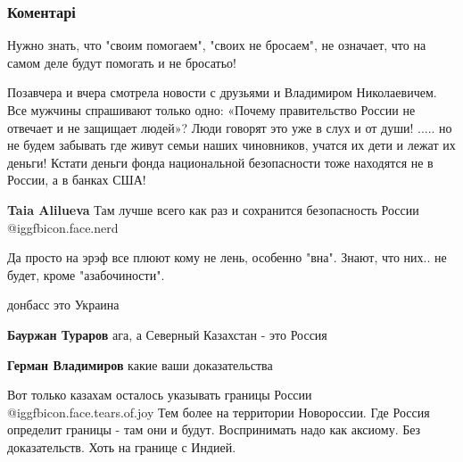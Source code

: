  
 
 
 
 
\subsubsection{Коментарі}

\begin{itemize} %

Нужно знать, что "своим помогаем", "своих не бросаем", не означает, что на
самом деле будут помогать и не бросатьо!


Позавчера и вчера смотрела новости с друзьями и Владимиром Николаевичем. Все
мужчины спрашивают только одно: «Почему правительство России не отвечает и не
защищает людей»? Люди говорят это уже в слух и от души! ..... но не будем
забывать где живут семьи наших чиновников, учатся их дети и лежат их деньги!
Кстати деньги фонда национальной безопасности тоже находятся не в России, а в
банках США!

\begin{itemize} %
\textbf{Taia Alilueva} Там лучше всего как раз и сохранится безопасность России  @igg{fbicon.face.nerd} 
\end{itemize} %

Да просто на эрэф все плюют кому не лень, особенно "вна".
Знают, что них.. не будет, кроме "азабочиности".

донбасс это Украина

\begin{itemize} %
\textbf{Бауржан Тураров} ага, а Северный Казахстан - это Россия

\textbf{Герман Владимиров} какие ваши доказательства

Вот только казахам осталось указывать границы России @igg{fbicon.face.tears.of.joy}  Тем более на территории Новороссии. Где Россия определит границы - там они и будут. Воспринимать надо как аксиому. Без доказательств. Хоть на границе с Индией.


\end{itemize}
\end{itemize}
